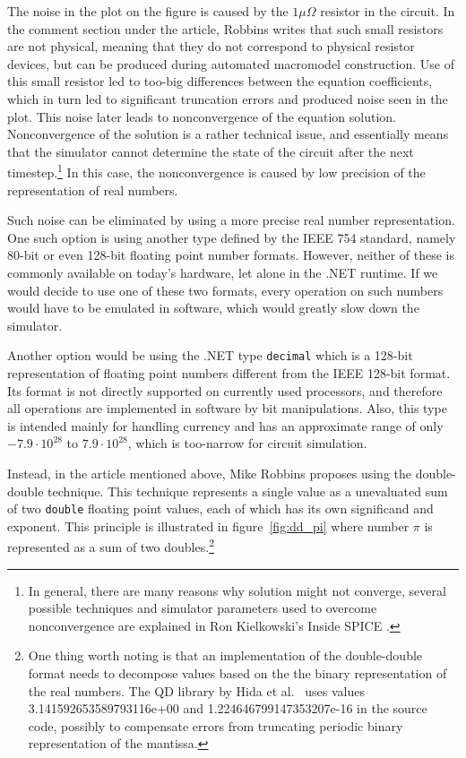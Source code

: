 The noise in the plot on the figure is caused by the $1\mu\Omega$ resistor in the circuit. In the comment section under the article, Robbins writes that such small resistors are not physical, meaning that they do not correspond to physical resistor devices, but can be produced during automated macromodel construction. Use of this small resistor led to too-big differences between the equation coefficients, which in turn led to significant truncation errors and produced noise seen in the plot. This noise later leads to nonconvergence of the equation solution. Nonconvergence of the solution is a rather technical issue, and essentially means that the simulator cannot determine the state of the circuit after the next timestep.\footnote{In general, there are many reasons why solution might not converge, several possible techniques and simulator parameters used to overcome nonconvergence are explained in Ron Kielkowski's Inside SPICE \cite{inside_spice}.} In this case, the nonconvergence is caused by low precision of the representation of real numbers.

Such noise can be eliminated by using a more precise real number representation. One such option is using another type defined by the IEEE 754 standard, namely 80-bit or even 128-bit floating point number formats. However, neither of these is commonly available on today's hardware, let alone in the .NET runtime. If we would decide to use one of these two formats, every operation on such numbers would have to be emulated in software, which would greatly slow down the simulator.

Another option would be using the .NET type \texttt{decimal} which is a 128-bit representation of floating point numbers different from the IEEE 128-bit format. Its format is not directly supported on currently used processors, and therefore all operations are implemented in software by bit manipulations. Also, this type is intended mainly for handling currency and has an approximate range of only $-7.9 \cdot 10^{28}$ to $7.9 \cdot 10^{28}$,  which is too-narrow for circuit simulation.

Instead, in the article mentioned above, Mike Robbins proposes using the double-double technique. This technique represents a single value as a unevaluated sum of two \texttt{double} floating point values, each of which has its own significand and exponent. This principle is illustrated in figure~\ref{fig:dd_pi} where number $\pi$ is represented as a sum of two doubles.\footnote{One thing worth noting is that an implementation of the double-double format needs to decompose values based on the the binary representation of the real numbers. The QD library by Hida et al.\ \cite{qd-lib} uses values 3.141592653589793116e+00 and 1.224646799147353207e-16 in the source code, possibly to compensate errors from truncating periodic binary representation of the mantissa.}

